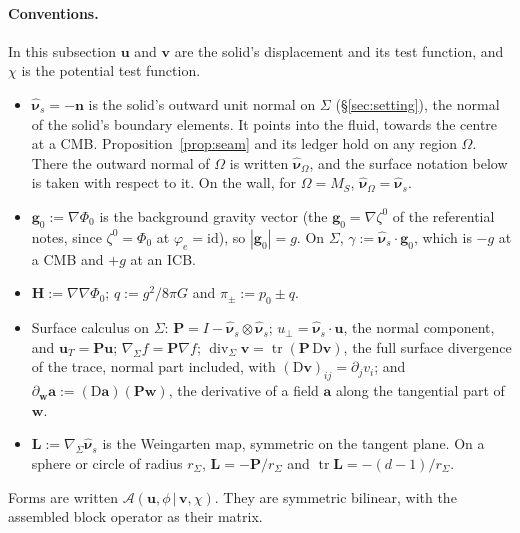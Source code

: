 \documentclass[11pt]{article}
\theoremstyle{definition}
\theoremstyle{remark}
\newcommand{\bu}{\mathbf{u}}
\newcommand{\bv}{\mathbf{v}}
\newcommand{\bw}{\mathbf{w}}
\newcommand{\bn}{\mathbf{n}}
\newcommand{\Div}{\operatorname{div}}
\newcommand{\nuhs}{\hat{\boldsymbol{\nu}}_s}
\newcommand{\nuho}{\hat{\boldsymbol{\nu}}_\Omega}
\begin{document}
\paragraph{Conventions.} In this subsection $\bu$ and $\bv$ are the
solid's displacement and its test function, and $\chi$ is the
potential test function.
\begin{itemize}
\item $\nuhs = -\bn$ is the solid's outward unit normal on
  $\Sigma$ (\S\ref{sec:setting}), the normal of the solid's boundary
  elements. It points into the fluid, towards the centre at a CMB.
  Proposition~\ref{prop:seam} and its ledger hold on any region
  $\Omega$. There the outward normal of $\Omega$ is written $\nuho$,
  and the surface notation below is taken with respect to it. On the
  wall, for $\Omega = M_S$, $\nuho = \nuhs$.
\item $\mathbf g_0 := \nabla\Phi_0$ is the background gravity vector
  (the $\mathbf g_0 = \nabla\zeta^0$ of the referential notes, since
  $\zeta^0 = \Phi_0$ at $\varphi_e = \mathrm{id}$), so $|\mathbf g_0| =
  g$. On $\Sigma$, $\gamma := \nuhs\cdot\mathbf g_0$, which is $-g$
  at a CMB and $+g$ at an ICB.
\item $\mathbf H := \nabla\nabla\Phi_0$; $q := g^2/8\pi G$ and $\pi_\pm
  := p_0 \pm q$.
\item Surface calculus on $\Sigma$: $\mathbf P = I - \nuhs\otimes\nuhs$; $u_\perp = \nuhs\cdot\bu$, the normal
  component, and $\bu_T =
  \mathbf P\bu$; $\nabla_\Sigma f = \mathbf P\nabla f$; $\Div_\Sigma\bv
  = \operatorname{tr}(\mathbf P\,\mathrm D\bv)$, the full surface
  divergence of the trace, normal part included, with $(\mathrm
  D\bv)_{ij} = \partial_jv_i$; and $\partial_{\bw}\mathbf a :=
  (\mathrm D\mathbf a)(\mathbf P\bw)$, the derivative of a field
  $\mathbf a$ along the tangential part of $\bw$.
\item $\mathbf L := \nabla_\Sigma\nuhs$ is the Weingarten map,
  symmetric on the tangent plane. On a sphere or circle of radius
  $r_\Sigma$, $\mathbf L = -\mathbf P/r_\Sigma$ and $\operatorname{tr}
  \mathbf L = -(d-1)/r_\Sigma$.
\end{itemize}
Forms are written $\mathcal A(\bu, \phi \,|\, \bv, \chi)$. They are
symmetric bilinear, with the assembled block operator as their matrix.
\end{document}
